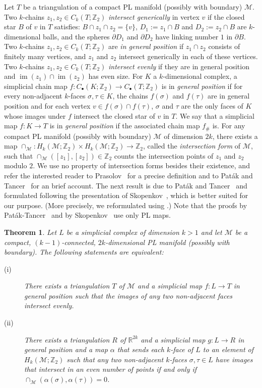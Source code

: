 \documentclass[11pt]{article}
\newcommand{\R}{\mathbb{R}}
\newcommand{\Z}{\mathbb{Z}}
\newcommand{\M}{\mathcal{M}}
\DeclareMathOperator{\im}{im}
\newcommand{\defn}[1]{\emph{\color{violet}#1}}
\newtheorem{theorem}{Theorem}
\begin{document}
%
\medskip
%
Let $T$ be a triangulation of a compact PL manifold (possibly with boundary) $\M$. Two $k$-chains $z_1,z_2\in C_k(T;\Z_2)$ \defn{intersect generically} in vertex $v$ if the closed star $B$ of $v$ in $T$ satisfies: $B \cap z_1 \cap z_2 = \{v\}$, $D_1:= z_1 \cap B$ and $D_2:= z_2 \cap B$ are $k$-dimensional balls, and the spheres $\partial D_1$ and $\partial D_2$ have linking number $1$ in $\partial B$. Two $k$-chains $z_1,z_2\in C_k(T;\Z_2)$ are \defn{in general position} if $z_1 \cap z_2$ consists of finitely many vertices, and $z_1$ and $z_2$ intersect generically in each of these vertices. Two $k$-chains $z_1,z_2\in C_k(T;\Z_2)$ \defn{intersect evenly} if they are in general position and $\im(z_1)\cap \im(z_2)$ has even size.
%
\medskip
%
For $K$ a $k$-dimensional complex, a simplicial chain map $f:C_\bullet(K;\Z_2) \to C_\bullet(T;\Z_2)$ is in \defn{general position} if for every non-adjacent $k$-faces $\sigma, \tau \in K$, the chains $f(\sigma)$ and $f(\tau)$ are in general position and for each vertex $v \in f(\sigma) \cap f(\tau)$, $\sigma$ and $\tau$ are the only faces of $K$ whose images under $f$ intersect the closed star of $v$ in $T$. We say that a simplicial map $f:K \to T$ is  in \defn{general position} if the associated chain map $f_\#$ is.
%
\medskip
%
For any compact PL manifold (possibly with boundary) $\M$ of dimension $2k$, there exists a map $\cap_{\M}:H_k(\M;\Z_2)\times H_k(\M;\Z_2)\to\Z_2$, called the \defn{intersection form} of $\M$, such that $\cap_{\M}([z_1],[z_2])\in\Z_2$ counts the intersection points of $z_1$ and $z_2$ modulo $2$. We use no property of intersection forms besides their existence, and refer the interested reader to Prasolov~\cite[Chapter~2, $\S$2.7]{prasolov2007elements} for a precise definition and to Paták and Tancer~\cite{patak-tancer} for an brief account.
%
%
\medskip
%
The next result is due to Paták and Tancer~\cite[Proposition~21]{patak-tancer} and formulated following the presentation of Skopenkov~\cite{skopenkov}, which is better suited for our purpose. (More precisely, we reformulated \cite[Theorem~1.1.5]{skopenkov} using \cite[Lemma~2.1.1]{skopenkov}.) Note that the proofs by Paták-Tancer~\cite{patak-tancer} and by Skopenkov~\cite{skopenkov} use only PL maps.
%
\begin{theorem}
  \label{th:skopenkov}
  Let $L$ be a simplicial complex of dimension $k>1$ and let $\M$ be a compact, $(k-1)$-connected, $2k$-dimensional PL manifold (possibly with boundary). The following statements are equivalent:
%
  \begin{description}
  \item[(i)] There exists a triangulation $T$ of $\M$ and a simplicial map  $f:L \to T$ in general position such that the images of any two non-adjacent faces intersect evenly.\medskip
%
  \item[(ii)] There exists a triangulation $R$ of $\R^{2k}$ and a simplicial map $g: L \to R$ in general position and a map $\alpha$ that sends each $k$-face of $L$ to an element of $H_k(\M;\Z_2)$ such that any two non-adjacent $k$-faces $\sigma,\tau \in L$ have images that intersect in an even number of points if and only if $\cap_{\M}(\alpha(\sigma),\alpha(\tau)) = 0$.
  \end{description}
\end{theorem}
%
%
\end{document}
